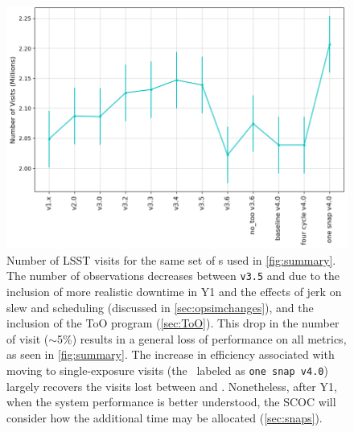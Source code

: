 \begin{figure}
    \centering
    \includegraphics[width=0.9\linewidth]{figures/total_nvisits.png}
    \caption{Number of LSST visits for the same set of \opsim s used in \autoref{fig:summary}. The number of observations decreases between \texttt{v3.5} and  due to the inclusion of more realistic downtime in Y1 and the effects of jerk on slew and scheduling (discussed in \autoref{sec:opsimchanges}), and the inclusion of the ToO program (\autoref{sec:ToO}). This drop in the number of visit ($\sim$5\%) results in a general loss of performance on all metrics, as seen in \autoref{fig:summary}. The increase in efficiency associated with moving to single-exposure visits (the \opsim\ labeled as \texttt{one snap v4.0}) largely recovers the visits lost between  and . Nonetheless, after Y1, when the system performance is better understood, the SCOC will consider how the additional time may be allocated (\autoref{sec:snaps}). }
    \label{fig:nvisits}
\end{figure}

\FloatBarrier

